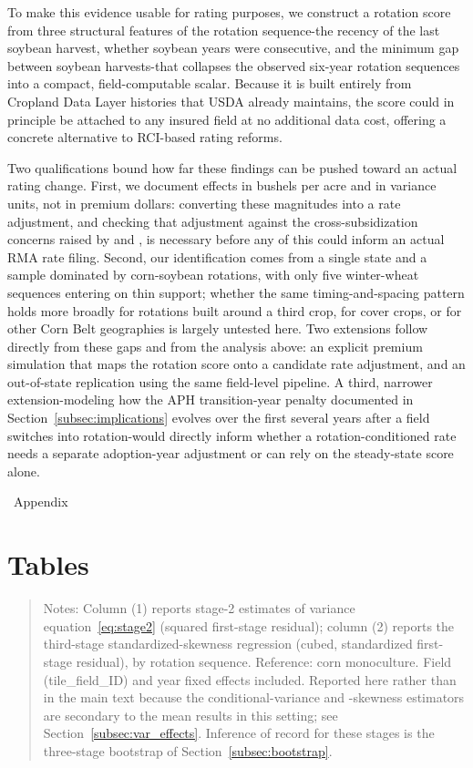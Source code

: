 \documentclass[12pt,letterpaper]{article}
\theoremstyle{remark}
\theoremstyle{remark}
\theoremstyle{plain}
\theoremstyle{definition}
\begin{document}
To make this evidence usable for rating purposes, we construct a rotation score from three structural features of the rotation sequence-the recency of the last soybean harvest, whether soybean years were consecutive, and the minimum gap between soybean harvests-that collapses the observed six-year rotation sequences into a compact, field-computable scalar. Because it is built entirely from Cropland Data Layer histories that USDA already maintains, the score could in principle be attached to any insured field at no additional data cost, offering a concrete alternative to RCI-based rating reforms.

Two qualifications bound how far these findings can be pushed toward an actual rating change. First, we document effects in bushels per acre and in variance units, not in premium dollars: converting these magnitudes into a rate adjustment, and checking that adjustment against the cross-subsidization concerns raised by \citet{Ramaswami1993} and \citet{Babcock1996}, is necessary before any of this could inform an actual RMA rate filing. Second, our identification comes from a single state and a sample dominated by corn-soybean rotations, with only five winter-wheat sequences entering on thin support; whether the same timing-and-spacing pattern holds more broadly for rotations built around a third crop, for cover crops, or for other Corn Belt geographies is largely untested here. Two extensions follow directly from these gaps and from the analysis above: an explicit premium simulation that maps the rotation score onto a candidate rate adjustment, and an out-of-state replication using the same field-level pipeline. A third, narrower extension-modeling how the APH transition-year penalty documented in Section~\ref{subsec:implications} evolves over the first several years after a field switches into rotation-would directly inform whether a rotation-conditioned rate needs a separate adoption-year adjustment or can rely on the steady-state score alone.

\newpage


\newpage
\ Appendix

\section*{Tables}


\begin{quote}
\small
Notes: Column (1) reports stage-2 estimates of variance equation~\eqref{eq:stage2} (squared first-stage residual); column (2) reports the third-stage standardized-skewness regression (cubed, standardized first-stage residual), by rotation sequence. Reference: corn monoculture. Field (tile\_field\_ID) and year fixed effects included. Reported here rather than in the main text because the conditional-variance and -skewness estimators are secondary to the mean results in this setting; see Section~\ref{subsec:var_effects}. Inference of record for these stages is the three-stage bootstrap of Section~\ref{subsec:bootstrap}.
\end{quote}
\end{document}
